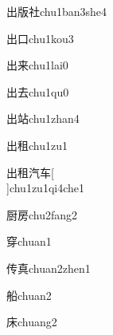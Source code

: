 \begin{verbete}[5;8;7]{出版社}{chu1ban3she4}
\end{verbete}

\begin{verbete}[5;3]{出口}{chu1kou3}
\end{verbete}

\begin{verbete}[5;7]{出来}{chu1lai0}
\end{verbete}

\begin{verbete}[5;5]{出去}{chu1qu0}
\end{verbete}

\begin{verbete}[5;10]{出站}{chu1zhan4}
\end{verbete}

\begin{verbete}[5;10]{出租}{chu1zu1}
\end{verbete}

\begin{verbete}[5;10;7;4]{出租汽车}[\\]{chu1zu1qi4che1}
\end{verbete}

\begin{verbete}[12;8]{厨房}{chu2fang2}
\end{verbete}

\begin{verbete}[9]{穿}{chuan1}
\end{verbete}

\begin{verbete}[6;10]{传真}{chuan2zhen1}
\end{verbete}

\begin{verbete}[11]{船}{chuan2}
\end{verbete}

\begin{verbete}[7]{床}{chuang2}
\end{verbete}

